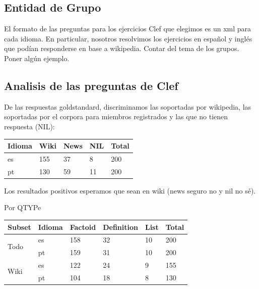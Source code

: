 \subsection{Entidad de Grupo}
\label{subsec:entidad-de-grupo}

El formato de las preguntas para los ejercicios Clef que elegimos es un xml para cada idioma. En particular, nosotros resolvimos los ejercicios en español y inglés que podían responderse en base a wikipedia. Contar del tema de los grupos. Poner algún ejemplo.

\subsection{Analisis de las preguntas de Clef}

De las respuestas goldstandard, discriminamos las soportadas por wikipedia, las soportadas por el corpora para miembros registrados y las que no tienen respuesta (NIL):

\begin{center}
\begin{tabular}{| l | l | l | l | l |}
\hline
Idioma & Wiki & News & NIL & Total \\ \hline
es & 155 & 37 & 8 & 200 \\ \hline
pt & 130 & 59 & 11 & 200 \\ \hline
\end{tabular}
\end{center}


Los resultados positivos esperamos que sean en wiki (news seguro no y nil no sé). 


Por QTYPe
\begin{center}
\begin{tabular}{| l | l | l | l | l | l |}
\hline
Subset & Idioma & Factoid & Definition & List & Total \\ \hline
\multirow{2}{*}{Todo} & es & 158 & 32 & 10 & 200 \\ \cline{2-6}
 & pt & 159 & 31 & 10 & 200 \\ \hline
 \multirow{2}{*}{Wiki} & es & 122 & 24 & 9 & 155 \\ \cline{2-6}
 & pt & 104 & 18 & 8 & 130 \\ \hline
\end{tabular}
\end{center}

